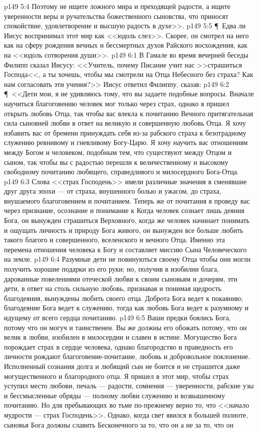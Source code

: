 \vs p149 5:4 Поэтому не ищите ложного мира и преходящей радости, а ищите уверенности веры и ручательства божественного сыновства, что приносят спокойствие, удовлетворение и высшую радость в духе>>.
\vs p149 5:5 \P\ Едва ли Иисус воспринимал этот мир как <<юдоль слез>>. Скорее, он смотрел на него как на сферу рождения вечных и бессмертных духов Райского восхождения, как на <<юдоль сотворения души>>.
\vs p149 6:1 В Гамале во время вечерней беседы Филипп сказал Иисусу: <<Учитель, почему Писание учит нас >>страшиться Господа<<, а ты хочешь, чтобы мы смотрели на Отца Небесного без страха? Как нам согласовать эти учения?>> Иисус ответил Филиппу, сказав:
\vs p149 6:2 \P\ <<Дети мои, я не удивляюсь тому, что вы задаете подобные вопросы. Вначале научиться благоговению человек мог только через страх, однако я пришел открыть любовь Отца, так чтобы вас влекла к почитанию Вечного притягательная сила сыновней любви в ответ на великую и совершенную любовь Отца. Я хочу избавить вас от бремени принуждать себя из\hyp{}за рабского страха к безотрадному служению ревнивому и гневливому Богу\hyp{}Царю. Я хочу научить вас отношениям между Богом и человеком, подобным тем, что существуют между Отцом и сыном, так чтобы вы с радостью перешли к величественному и высокому свободному почитанию любящего, справедливого и милосердного Бога\hyp{}Отца.
\vs p149 6:3 Слова <<страх Господень>> имели различные значения в сменявшие друг друга эпохи --- от страха, внушенного болью и ужасом, до страха, внушаемого благоговением и почитанием. Теперь же от почитания я проведу вас через признание, осознание и понимание к  Когда человек сознает лишь деяния Бога, он вынужден страшиться Верховного, когда же человек начинает понимать и ощущать личность и природу Бога живого, он вынужден все больше любить такого благого и совершенного, вселенского и вечного Отца. Именно эта перемена отношения человека к Богу и составляет миссию Сына Человеческого на земле.
\vs p149 6:4 Разумные дети не повинуються своему Отца чтобы они могли получить хорошие подарки из его руки; но, получив в изобилии блага, дарованные повелениями отеческой любви к своим сыновьям и дочерям, эти дети, в ответ на столь сильную любовь, признавая и понимая щедрость благодеяния, вынуждены любить своего отца. Доброта Бога ведет к покаянию; благодеяние Бога ведет к служению, тогда как любовь Бога ведет к разумному и идущему от всего сердца почитанию.
\vs p149 6:5 Ваши предки боялись Бога, потому что он могуч и таинственен. Вы же должны его обожать потому, что он велик в любви, изобилен в милосердии и славен в истине. Могущество Бога порождает страх в сердце человека, однако благородство и праведность его личности рождают благоговение\hyp{}почитание, любовь и добровольное поклонение. Исполненный сознания долга и любящий сын не боится и не страшится даже могущественного и благородного отца. Я пришел в этот мир, чтобы страх уступил место любови, печаль --- радости, сомнения --- уверенности, рабские узы и бессмысленные обряды --- полному любви служению и возвышенному почитанию. Но для пребывающих во тьме по\hyp{}прежнему верно то, что <<начало мудрости --- страх Господень>>. Однако, когда свет явился в большей полноте, сыновья Бога должны славить Бесконечного за то, что он  а не за то, что он 

